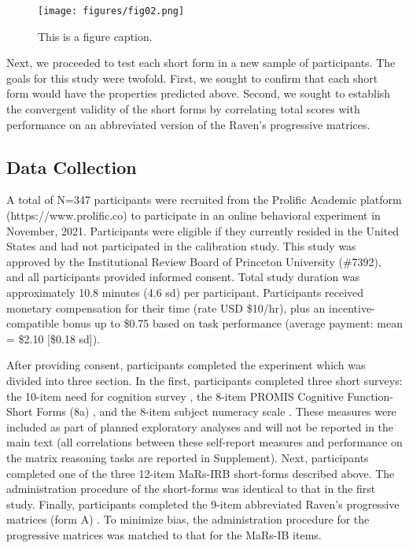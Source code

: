 \documentclass[a4paper,man,natbib]{apa6}
\begin{document}
\begin{figure}
\centering
\texttt{[image: figures/fig02.png]}
\caption{\label{fig:fig02}This is a figure caption.}
\end{figure}

Next, we proceeded to test each short form in a new sample of participants. The goals for this study were twofold. First, we sought to confirm that each short form would have the properties predicted above. Second, we sought to establish the convergent validity of the short forms by correlating total scores with performance on an abbreviated version of the Raven's progressive matrices.

\subsection{Data Collection}

A total of N=347 participants were recruited from the Prolific Academic platform (https://www.prolific.co) to participate in an online behavioral experiment in November, 2021. Participants were eligible if they currently resided in the United States and had not participated in the calibration study. This study was approved by the Institutional Review Board of Princeton University (\#7392), and all participants provided informed consent. Total study duration was approximately 10.8 minutes (4.6 sd) per participant. Participants received monetary compensation for their time (rate USD \$10/hr), plus an incentive-compatible bonus up to \$0.75 based on task performance (average payment: mean = \$2.10 [\$0.18 sd]). 

After providing consent, participants completed the experiment which was divided into three section. In the first, participants completed three short surveys: the 10-item need for cognition survey \citep{chiesi2018applying}, the 8-item PROMIS Cognitive Function-Short Forms (8a) \citep{iverson2021normative}, and the 8-item subject numeracy scale \citep{fagerlin2007measuring}. These measures were included as part of planned exploratory analyses and will not be reported in the main text (all correlations between these self-report measures and performance on the matrix reasoning tasks are reported in Supplement). Next, participants completed one of the three 12-item MaRs-IRB short-forms described above. The administration procedure of the short-forms was identical to that in the first study. Finally, participants completed the 9-item abbreviated Raven's progressive matrices (form A) \citep{bilker2012development}. To minimize bias, the administration procedure for the progressive matrices was matched to that for the MaRs-IB items.
\end{document}
